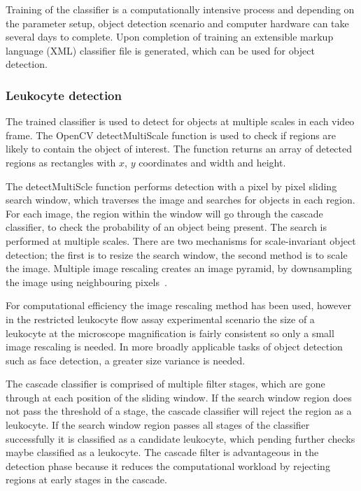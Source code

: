 Training of the classifier is a computationally intensive process and depending on the parameter setup, object detection scenario and computer hardware can take several days to complete. Upon completion of training an extensible markup language (XML) classifier file is generated, which can be used for object detection.

\subsubsection{Leukocyte detection}
The trained classifier is used to detect for objects at multiple scales in each video frame. The OpenCV detectMultiScale function is used to check if regions are likely to contain the object of interest. The function returns an array of detected regions as rectangles with $x$, $y$ coordinates and width and height.

The detectMultiScle function performs detection with a pixel by pixel sliding search window, which traverses the image and searches for objects in each region. For each image, the region within the window will go through the cascade classifier, to check the probability of an object being present. The search is performed at multiple scales. There are two mechanisms for scale-invariant object detection; the first is to resize the search window, the second method is to scale the image. Multiple image rescaling creates an image pyramid, by downsampling the image using neighbouring pixels~\cite{Qiao2010}.

For computational efficiency the image rescaling method has been used, however in the restricted leukocyte flow assay experimental scenario the size of a leukocyte at the microscope magnification is fairly consistent so only a small image rescaling is needed. In more broadly applicable tasks of object detection such as face detection, a greater size variance is needed.

The cascade classifier is comprised of multiple filter stages, which are gone through at each position of the sliding window. If the search window region does not pass the threshold of a stage, the cascade classifier will reject the region as a leukocyte. If the search window region passes all stages of the classifier successfully it is classified as a candidate leukocyte, which pending further checks maybe classified as a leukocyte. The cascade filter is advantageous in the detection phase because it reduces the computational workload by rejecting regions at early stages in the cascade.

